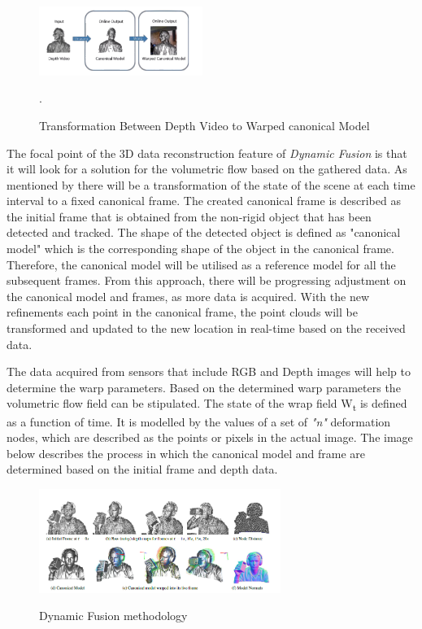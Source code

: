 \documentclass[12pt]{report}
\begin{document}
\vspace{5mm}

\begin{figure} %
    \centering
    \includegraphics[width=0.475\textwidth]{IMG_0073.png}
    \caption{Transformation Between Depth Video to Warped canonical Model} \cite[]{newcombe_fox_seitz_2015}.
\end{figure}
The focal point of the 3D data reconstruction feature of \textit{Dynamic Fusion}  is that it will look for a solution for the volumetric flow based on the gathered data.
As mentioned by  there will be a transformation of the state of the scene at each time interval to a fixed canonical frame.
The created canonical frame is described as the initial frame that is obtained from the non-rigid object that has been detected and tracked. The shape of the detected object is defined as "canonical model" which is the corresponding shape of the object in the canonical frame. 
Therefore, the canonical model will be utilised as a reference model for all the subsequent frames. From this approach, there will be progressing adjustment on the canonical model and frames, as more data is acquired.
With the new refinements each point in the canonical frame, the point clouds will be transformed and updated to the new location in real-time based on the received data.

The data acquired from sensors that include RGB and Depth images will help to determine the warp parameters. Based on the determined warp parameters the volumetric flow field can be stipulated.
The state of the wrap field W\textsubscript{t} is defined as a function of time. It is modelled by the values of a set of \textit{"n"} deformation nodes, which are described as the points or pixels in the actual image.
The image below describes the process in which the canonical model and frame are determined based on the initial frame and depth data. 
\begin{figure}{}%
    \centering
    \includegraphics[width=0.7\textwidth]{dynamicfusion2.png}
   \caption{Dynamic Fusion methodology}\cite[]{newcombe_fox_seitz_2015} 
\end{figure}
\end{document}
